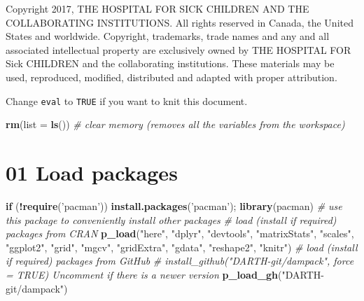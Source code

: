 \documentclass[
]{article}
\newenvironment{Shaded}{\begin{snugshade}}{\end{snugshade}}
\newcommand{\CommentTok}[1]{\textcolor[rgb]{0.56,0.35,0.01}{\textit{#1}}}
\newcommand{\ControlFlowTok}[1]{\textcolor[rgb]{0.13,0.29,0.53}{\textbf{#1}}}
\newcommand{\DataTypeTok}[1]{\textcolor[rgb]{0.13,0.29,0.53}{#1}}
\newcommand{\KeywordTok}[1]{\textcolor[rgb]{0.13,0.29,0.53}{\textbf{#1}}}
\newcommand{\NormalTok}[1]{#1}
\newcommand{\OperatorTok}[1]{\textcolor[rgb]{0.81,0.36,0.00}{\textbf{#1}}}
\newcommand{\StringTok}[1]{\textcolor[rgb]{0.31,0.60,0.02}{#1}}
\begin{document}
Copyright 2017, THE HOSPITAL FOR SICK CHILDREN AND THE COLLABORATING
INSTITUTIONS. All rights reserved in Canada, the United States and
worldwide. Copyright, trademarks, trade names and any and all associated
intellectual property are exclusively owned by THE HOSPITAL FOR Sick
CHILDREN and the collaborating institutions. These materials may be
used, reproduced, modified, distributed and adapted with proper
attribution.

\newpage

Change \texttt{eval} to \texttt{TRUE} if you want to knit this document.

\begin{Shaded}
\begin{Highlighting}[]
\KeywordTok{rm}\NormalTok{(}\DataTypeTok{list =} \KeywordTok{ls}\NormalTok{())      }\CommentTok{# clear memory (removes all the variables from the workspace)}
\end{Highlighting}
\end{Shaded}

\hypertarget{load-packages}{%
\section{01 Load packages}\label{load-packages}}

\begin{Shaded}
\begin{Highlighting}[]
\ControlFlowTok{if}\NormalTok{ (}\OperatorTok{!}\KeywordTok{require}\NormalTok{(}\StringTok{'pacman'}\NormalTok{)) }\KeywordTok{install.packages}\NormalTok{(}\StringTok{'pacman'}\NormalTok{); }\KeywordTok{library}\NormalTok{(pacman) }\CommentTok{# use this package to conveniently install other packages}
\CommentTok{# load (install if required) packages from CRAN}
\KeywordTok{p_load}\NormalTok{(}\StringTok{"here"}\NormalTok{, }\StringTok{"dplyr"}\NormalTok{, }\StringTok{"devtools"}\NormalTok{, }\StringTok{"matrixStats"}\NormalTok{, }\StringTok{"scales"}\NormalTok{, }\StringTok{"ggplot2"}\NormalTok{, }\StringTok{"grid"}\NormalTok{, }\StringTok{"mgcv"}\NormalTok{, }\StringTok{"gridExtra"}\NormalTok{, }\StringTok{"gdata"}\NormalTok{, }\StringTok{"reshape2"}\NormalTok{, }\StringTok{"knitr"}\NormalTok{)       }
\CommentTok{# load (install if required) packages from GitHub}
\CommentTok{# install_github("DARTH-git/dampack", force = TRUE) Uncomment if there is a newer version}
\KeywordTok{p_load_gh}\NormalTok{(}\StringTok{"DARTH-git/dampack"}\NormalTok{) }
\end{Highlighting}
\end{Shaded}
\end{document}
